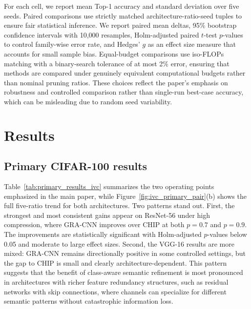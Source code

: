 \documentclass[preprint,12pt]{elsarticle}
\begin{document}
For each cell, we report mean Top-1 accuracy and standard deviation over five seeds. Paired comparisons use strictly matched architecture-ratio-seed tuples to ensure fair statistical inference. We report paired mean deltas, 95\% bootstrap confidence intervals with 10,000 resamples, Holm-adjusted paired $t$-test $p$-values to control family-wise error rate, and Hedges' $g$ as an effect size measure that accounts for small sample bias. Equal-budget comparisons use iso-FLOPs matching with a binary-search tolerance of at most 2\% error, ensuring that methods are compared under genuinely equivalent computational budgets rather than nominal pruning ratios. These choices reflect the paper's emphasis on robustness and controlled comparison rather than single-run best-case accuracy, which can be misleading due to random seed variability.

\section{Results}
\label{sec:results}

\subsection{Primary CIFAR-100 results}

Table~\ref{tab:primary_results_ivc} summarizes the two operating points emphasized in the main paper, while Figure~\ref{fig:ivc_primary_pair}(b) shows the full five-ratio trend for both architectures. Two patterns stand out. First, the strongest and most consistent gains appear on ResNet-56 under high compression, where GRA-CNN improves over CHIP at both $p=0.7$ and $p=0.9$. The improvements are statistically significant with Holm-adjusted $p$-values below 0.05 and moderate to large effect sizes. Second, the VGG-16 results are more mixed: GRA-CNN remains directionally positive in some controlled settings, but the gap to CHIP is small and clearly architecture-dependent. This pattern suggests that the benefit of class-aware semantic refinement is most pronounced in architectures with richer feature redundancy structures, such as residual networks with skip connections, where channels can specialize for different semantic patterns without catastrophic information loss.


\end{document}
